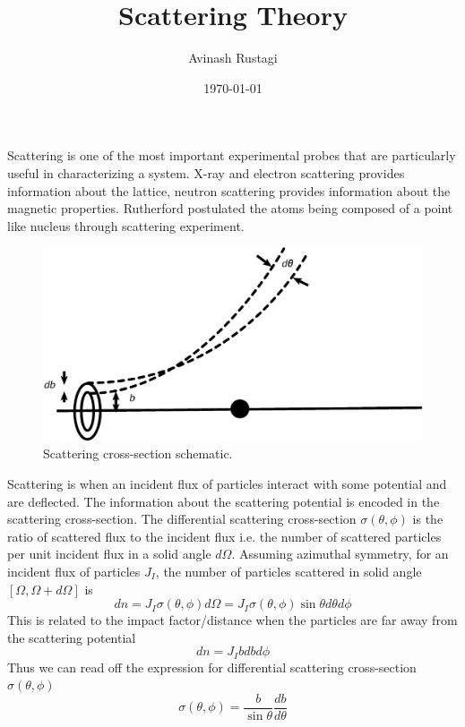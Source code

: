 \documentclass[aps,prb,onecolumn,notitlepage,showpacs,floatfix,superscriptaddress]{revtex4-1}
\begin{document}
\title{Scattering Theory}

\author{Avinash Rustagi}
%
\date{\today}

\maketitle
Scattering is one of the most important experimental probes that are particularly useful in characterizing a system. X-ray and electron scattering provides information about the lattice, neutron scattering provides information about the magnetic properties. Rutherford postulated the atoms being composed of a point like nucleus through scattering experiment.
\begin{figure}[hbtp]
\centering
\includegraphics[scale=0.1]{Cross_Section.png}
\caption{Scattering cross-section schematic.}
\end{figure}

Scattering is when an incident flux of particles interact with some potential and are deflected. The information about the scattering potential is encoded in the scattering cross-section. The differential scattering cross-section $\sigma(\theta,\phi)$ is the ratio of scattered flux to the incident flux i.e. the number of scattered particles per unit incident flux in a solid angle $d\Omega$. Assuming azimuthal symmetry, for an incident flux of particles $J_I$, the number of particles scattered in solid angle $[\Omega,\Omega+d\Omega]$ is
\begin{equation}
dn = J_I \sigma(\theta,\phi) d\Omega = J_I \sigma(\theta,\phi)\sin\theta d\theta d\phi
\end{equation}
This is related to the impact factor/distance when the particles are far away from the scattering potential
 \begin{equation}
dn = J_I bdbd\phi
\end{equation}
Thus we can read off the expression for differential scattering cross-section $\sigma(\theta,\phi)$
\begin{equation}
\sigma(\theta,\phi) = \dfrac{b}{\sin\theta} \dfrac{db}{d\theta}
\end{equation}
\end{document}
